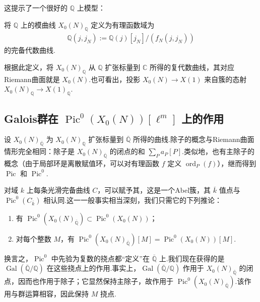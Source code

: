 这提示了一个很好的 $\mathbb Q$ 上模型：

\begin{definition*}

将 $\mathbb Q$ 上的模曲线 $X_0(N)_{\mathbb Q}$ 定义为有理函数域为
\begin{align*}
\mathbb Q(j,j_N):=\mathbb Q(j)[j_N]/(f_N(j,j_N))
\end{align*}
的完备代数曲线.

\end{definition*}

根据此定义，将 $X_0(N)_{\mathbb Q}$ 从 $\mathbb Q$ 扩张标量到 $\mathbb C$ 所得的复代数曲线，其对应Riemann曲面就是 $X_0(N)$.也可看出，投影 $X_0(N)\longrightarrow X(1)$ 来自簇的态射 $X_0(N)_{\mathbb Q}\longrightarrow X(1)_{\mathbb Q}$.



\subsection{Galois群在 \texorpdfstring{$\operatorname{Pic}^0(X_0(N))[\ell^m]$}{Pic⁰(X₀(N))[ℓᵐ]} 上的作用}\label{sec:modular-2-3-4}

设 $X_0(N)_{\overline{\mathbb Q}}$ 为 $X_0(N)_{\mathbb Q}$ 扩张标量到 $\overline{\mathbb Q}$ 所得的曲线.除子的概念与Riemann曲面情形完全相同：除子是 $X_0(N)_{\overline{\mathbb Q}}$ 的闭点的和 $\sum_P a_P[P]$.类似地，也有主除子的概念（由于局部环是离散赋值环，可以对有理函数 $f$ 定义 $\operatorname{ord}_P(f)$），继而得到 $\operatorname{Pic}$ 和 $\operatorname{Pic}^0$.



对域 $k$ 上每条光滑完备曲线 $C$，可以赋予其，这是一个Abel簇，其 $\overline k$ 值点与 $\operatorname{Pic}^0(C_{\overline k})$ 相认同.这一一般事实相当深刻，我们只需它的下列推论：

\begin{enumerate}[label=\roman*)]

\item 有 $\operatorname{Pic}^0(X_0(N)_{\overline{\mathbb Q}})\subset\operatorname{Pic}^0(X_0(N))$；

\item 对每个整数 $M$，有 $\operatorname{Pic}^0(X_0(N)_{\overline{\mathbb Q}})[M]=\operatorname{Pic}^0(X_0(N))[M]$.

\end{enumerate}

换言之，$\operatorname{Pic}^0$ 中先验为复数的挠点都``定义''在 $\overline{\mathbb Q}$ 上.我们现在获得的是 $\operatorname{Gal}(\overline{\mathbb Q}/\mathbb Q)$ 在这些挠点上的作用.事实上，$\operatorname{Gal}(\overline{\mathbb Q}/\mathbb Q)$ 作用于 $X_0(N)_{\overline{\mathbb Q}}$ 的闭点，因而也作用于除子；它显然保持主除子，故作用于 $\operatorname{Pic}^0(X_0(N)_{\overline{\mathbb Q}})$.该作用与群运算相容，因此保持 $M$ 挠点.



